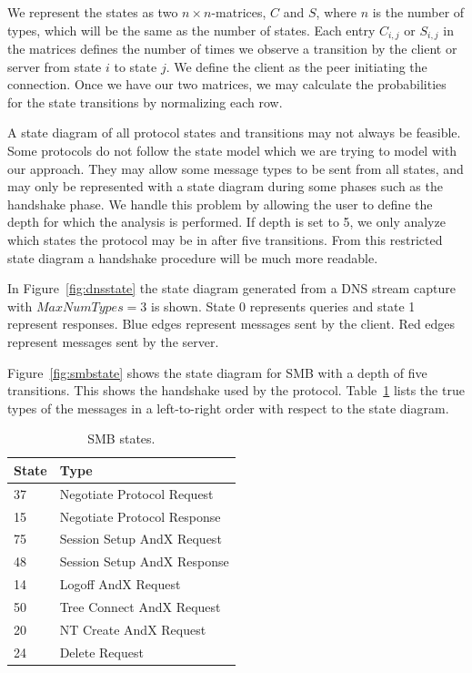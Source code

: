\documentclass[a4paper]{report}
\begin{document}
We represent the states as two $n \times n$-matrices, $C$ and  $S$, where 
$n$ is the number of types, which will be the same as the number of states.
Each entry $C_{i,j}$ or $S_{i,j}$ in the matrices defines the number of times
we observe a transition by the client or server from state $i$ to state $j$.
We define the client as the peer initiating the connection. Once we have our
two matrices, we may calculate the probabilities for the state transitions by
normalizing each row.

A state diagram of all protocol states and transitions may not always be
feasible. Some protocols do not follow the state model which we are
trying to model with our approach. They may allow some message types to
be sent from all states, and may only be represented with a state diagram
during some phases such as the handshake phase. We handle this problem by
allowing the user to define the depth for which the analysis is performed.
If depth is set to 5, we only analyze which states the protocol may be in
after five transitions. From this restricted state diagram a handshake
procedure will be much more readable.


In Figure~\ref{fig:dnsstate} the state diagram generated from a DNS stream
capture with $MaxNumTypes = 3$ is shown. State 0 represents queries and state 1
represent responses. Blue edges represent messages sent by the client. Red
edges represent messages sent by the server.

Figure~\ref{fig:smbstate} shows the state diagram for SMB with a depth of
five transitions. This shows the handshake used by the protocol.
Table~\ref{tab:smb} lists the true types of the messages in a left-to-right
order with respect to the state diagram.

\begin{table}
    \centering
    \captionsetup{width=0.8\textwidth}
    \caption{SMB states.}
    \begin{tabular}{ | l | l |}
        \hline
        \textbf{State}&\textbf{Type}\\ \hline
        37          & Negotiate Protocol Request    \\ \hline
        15          & Negotiate Protocol Response   \\ \hline
        75          & Session Setup AndX Request    \\ \hline
        48          & Session Setup AndX Response   \\ \hline
        14          & Logoff AndX Request           \\ \hline
        50          & Tree Connect AndX Request     \\ \hline
        20          & NT Create AndX Request        \\ \hline
        24          & Delete Request                \\ \hline
    \end{tabular}
    \label{tab:smb}
\end{table}
\end{document}
